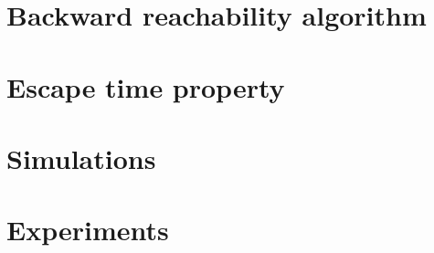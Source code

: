 \documentclass[electronic]{kthesis}
\newcommand{\vect}[1]{\ensuremath{ \mathbf{#1}}}
\theoremstyle{named}
\begin{document}
\chapter{Backward reachability algorithm}

%
\chapter{Escape time property}

%
%
\chapter{Simulations}

\newcommand{\um}{\u_{-}}
\newcommand{\up}{\u_{+}}
\newcommand{\uo}{\vect{0}}






\chapter{Experiments}




%

{}
\end{document}
